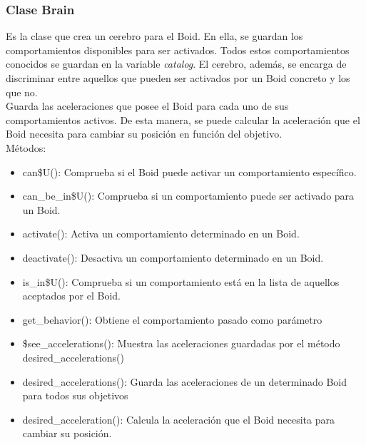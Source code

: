 \subsubsection{Clase Brain}
\label{subsubsection:brain}

Es la clase que crea un cerebro para el Boid. En ella, se guardan los comportamientos disponibles para ser activados. Todos estos 
comportamientos conocidos se guardan en la variable \textit{catalog}. El cerebro, además, se encarga de discriminar entre aquellos que pueden ser activados por 
un Boid concreto y los que no.\\

Guarda las aceleraciones que posee el Boid para cada uno de sus comportamientos activos. De esta manera, se puede calcular la aceleración que 
el Boid necesita para cambiar su posición en función del objetivo.\\


Métodos:
\begin{itemize}
\item can\$U():
Comprueba si el Boid puede activar un comportamiento específico.

\item can\_be\_in\$U():
Comprueba si un comportamiento puede ser activado para un Boid.

\item activate():
Activa un comportamiento determinado en un Boid.

\item deactivate():
Desactiva un comportamiento determinado en un Boid.

\item is\_in\$U():
Comprueba si un comportamiento está en la lista de aquellos aceptados por el Boid.

\item get\_behavior():
Obtiene el comportamiento pasado como parámetro

\item \$see\_accelerations():
Muestra las aceleraciones guardadas por el método desired\_accelerations()

\item desired\_accelerations():
Guarda las aceleraciones de un determinado Boid para todos sus objetivos

\item desired\_acceleration():
Calcula la aceleración que el Boid necesita para cambiar su posición.
\end{itemize}




